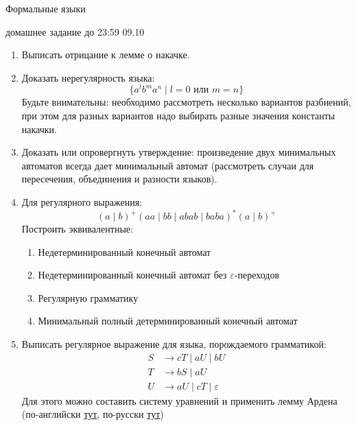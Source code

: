 \documentclass[12pt]{article}
\begin{document}
\begin{center} {\LARGE Формальные языки} \end{center}

\begin{center} \Large домашнее задание до 23:59 09.10 \end{center}
\bigskip

\begin{enumerate}
  \item Выписать отрицание к лемме о накачке. 
  \item Доказать нерегулярность языка:
  \[ \{ a^l b^m a^n \mid l = 0 \text{ или } m = n \} \]
  Будьте внимательны: необходимо рассмотреть несколько вариантов разбиений, при этом для разных вариантов надо выбирать разные значения константы накачки.
  \item Доказать или опровергнуть утверждение: произведение двух минимальных автоматов всегда дает минимальный автомат (рассмотреть случаи для пересечения, объединения и разности языков).
  \item Для регулярного выражения: 
   \[ (a \mid b)^+ (aa \mid bb \mid abab \mid baba)^* (a \mid b)^+\]
  Построить эквивалентные: 
  \begin{enumerate}
    \item Недетерминированный конечный автомат  
    \item Недетерминированный конечный автомат без $\varepsilon$-переходов
    \item Регулярную грамматику 
    \item Минимальный полный детерминированный конечный автомат 
  \end{enumerate}
  \item Выписать регулярное выражение для языка, порождаемого грамматикой: 
  \begin{align*}
    S &\to c T \mid a U \mid b U \\ 
    T &\to b S \mid a U \\ 
    U &\to a U \mid c T \mid \varepsilon 
  \end{align*}
  Для этого можно составить систему уравнений и применить лемму Ардена (по-английски \href{https://cs.stackexchange.com/questions/2016/how-to-convert-finite-automata-to-regular-expressions/2017#2017}{тут},  по-русски \href{https://coderlessons.com/tutorials/akademicheskii/izuchite-teoriiu-avtomatov/teorema-ardena}{тут}) 
\end{enumerate}
\end{document}
